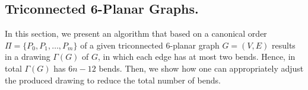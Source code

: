 \documentclass[a4paper,twoside,11pt]{article}
\begin{document}
\subsection{Triconnected 6-Planar Graphs.}
\label{sec:6planar}


In this section, we present an algorithm that based on a canonical
order $\Pi =\{ P_0, P_1, \ldots, P_m \}$ of a given triconnected
$6$-planar graph $G=(V,E)$ results in a drawing $\Gamma(G)$ of $G$,
in which each edge has at most two bends. Hence, in total
$\Gamma(G)$ has $6n-12$ bends. Then, we show how one can
appropriately adjust the produced drawing to reduce the total
number of bends.

\begin{figure}[b!]
    \centering 
    \begin{minipage}[b]{.14\textwidth}
        \centering
    \end{minipage} 
    \hfill
    \begin{minipage}[b]{.14\textwidth}
        \centering
    \end{minipage}  
    \hfill
    \begin{minipage}[b]{.14\textwidth} 
        \centering
    \end{minipage}  
    \hfill
    \begin{minipage}[b]{.14\textwidth}
        \centering
    \end{minipage}  
    \hfill
    \begin{minipage}[b]{.14\textwidth}
        \centering
    \end{minipage}  
    \hfill
    \begin{minipage}[b]{.14\textwidth}
        \centering
    \end{minipage}  
    \hfill
    \begin{minipage}[b]{.18\textwidth}
        \centering

\end{minipage}
\end{figure}
\end{document}
